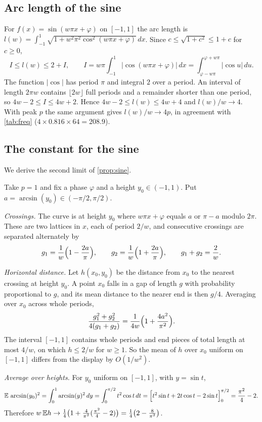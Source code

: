 \subsection{Arc length of the sine}

For $f(x)=\sin(w\pi x+\varphi)$ on $[-1,1]$ the arc length is
$l(w)=\int_{-1}^{1}\sqrt{1+w^2\pi^2\cos^2(w\pi x+\varphi)}\,dx$. Since
$c\le\sqrt{1+c^2}\le1+c$ for $c\ge0$,
\[
  I\le l(w)\le2+I,\qquad
  I=w\pi\int_{-1}^{1}|\cos(w\pi x+\varphi)|\,dx=\int_{\varphi-w\pi}^{\varphi+w\pi}|\cos u|\,du .
\]
The function $|\cos|$ has period $\pi$ and integral $2$ over a period. An
interval of length $2\pi w$ contains $\lfloor2w\rfloor$ full periods and a
remainder shorter than one period, so $4w-2\le I\le4w+2$. Hence
$4w-2\le l(w)\le4w+4$ and $l(w)/w\to4$. With peak $p$ the same argument gives
$l(w)/w\to4p$, in agreement with \cref{tab:freq} ($4\times0.816\times64=208.9$).

\subsection{The constant for the sine}

We derive the second limit of \cref{prop:sine}.

Take $p=1$ and fix a phase $\varphi$ and a height $y_0\in(-1,1)$. Put
$a=\arcsin(y_0)\in(-\pi/2,\pi/2)$.

\emph{Crossings.} The curve is at height $y_0$ where $w\pi x+\varphi$ equals
$a$ or $\pi-a$ modulo $2\pi$. These are two lattices in $x$, each of period
$2/w$, and consecutive crossings are separated alternately by
\[
  g_1=\frac1w\Bigl(1-\frac{2a}{\pi}\Bigr),\qquad
  g_2=\frac1w\Bigl(1+\frac{2a}{\pi}\Bigr),\qquad g_1+g_2=\frac2w .
\]

\emph{Horizontal distance.} Let $h(x_0,y_0)$ be the distance from $x_0$ to the
nearest crossing at height $y_0$. A point $x_0$ falls in a gap of length $g$
with probability proportional to $g$, and its mean distance to the nearer end
is then $g/4$. Averaging over $x_0$ across whole periods,
\[
  \frac{g_1^2+g_2^2}{4(g_1+g_2)}=\frac{1}{4w}\Bigl(1+\frac{4a^2}{\pi^2}\Bigr).
\]
The interval $[-1,1]$ contains whole periods and end pieces of total length at
most $4/w$, on which $h\le2/w$ for $w\ge1$. So the mean of $h$ over $x_0$
uniform on $[-1,1]$ differs from the display by $O(1/w^2)$.

\emph{Average over heights.} For $y_0$ uniform on $[-1,1]$, with $y=\sin t$,
\[
  \mathbb{E}\,\arcsin(y_0)^2=\int_0^1\arcsin(y)^2\,dy=\int_0^{\pi/2}t^2\cos t\,dt
  =\Bigl[t^2\sin t+2t\cos t-2\sin t\Bigr]_0^{\pi/2}=\frac{\pi^2}{4}-2 .
\]
Therefore
$w\,\mathbb{E} h\to\frac14\bigl(1+\frac{4}{\pi^2}(\frac{\pi^2}{4}-2)\bigr)=\frac14\bigl(2-\frac{8}{\pi^2}\bigr)$.

